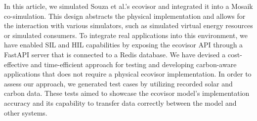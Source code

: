 In this article, we simulated Souza et al.'s \cite{souza2023} ecovisor and
integrated it into a Mosaik co-simulation. This design abstracts the physical
implementation and allows for the interaction with various simulators, such as
simulated virtual energy resources or simulated consumers. To integrate real
applications into this environment, we have enabled SIL and HIL capabilities by
exposing the ecovisor API through a FastAPI server that is connected to a Redis
database. We have devised a cost-effective and time-efficient approach for
testing and developing carbon-aware applications that does not require a
physical ecovisor implementation. In order to assess our approach, we generated
test cases by utilizing recorded solar and carbon data. These tests aimed to
showcase the ecovisor model's implementation accuracy and its capability to
transfer data correctly between the model and other systems.
